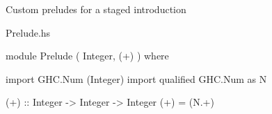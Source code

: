 \begin{frame}[fragile]

{\large
Custom preludes for a staged introduction
}
\nl

\begin{block}{Prelude.hs}
\begin{haskellcode}
module Prelude
  ( Integer, (+)
  )
where

import GHC.Num (Integer)
import qualified GHC.Num as N

(+) :: Integer -> Integer -> Integer
(+) = (N.+)
\end{haskellcode}
\end{block}
\end{frame}


